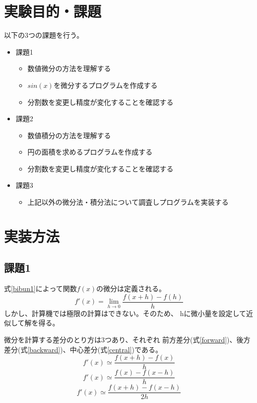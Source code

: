\documentclass[dvipdfmx]{jsarticle}
\begin{document}
\section{実験目的・課題}
以下の3つの課題を行う。
\begin{itemize}
  \item 課題1
        \begin{itemize}
          \item 数値微分の方法を理解する
          \item $sin(x)$を微分するプログラムを作成する
          \item 分割数を変更し精度が変化することを確認する
        \end{itemize}
  \item 課題2
        \begin{itemize}
          \item 数値積分の方法を理解する
          \item 円の面積を求めるプログラムを作成する
          \item 分割数を変更し精度が変化することを確認する
        \end{itemize}
  \item 課題3
        \begin{itemize}
          \item 上記以外の微分法・積分法について調査しプログラムを実装する
        \end{itemize}
\end{itemize}

\section{実装方法}

\subsection{課題1}

式\ref{bibun1}によって関数$f(x)$の微分は定義される。
\begin{equation}
  f'(x) = \lim_{h \to 0} \frac{f(x+h)-f(h)}{h}
  \label{bibun1}
\end{equation}
しかし、計算機では極限の計算はできない。そのため、
hに微小量を設定して近似して解を得る。

微分を計算する差分のとり方は3つあり、それぞれ
前方差分(式\ref{forward})、後方差分(式\ref{backward})、中心差分(式\ref{central})である。
\begin{equation}
  f'(x) \simeq \frac{f(x+h)-f(x)}{h}
  \label{forward}
\end{equation}
\begin{equation}
  f'(x) \simeq \frac{f(x)-f(x-h)}{h}
  \label{backward}
\end{equation}
\begin{equation}
  f'(x) \simeq \frac{f(x+h)-f(x-h)}{2h}
  \label{central}
\end{equation}
\end{document}
